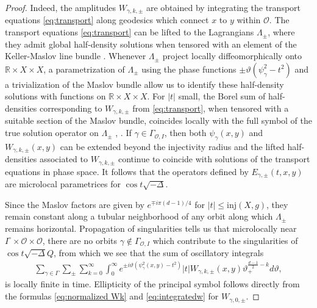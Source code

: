 \documentclass[11pt,letterpaper,oneside]{amsart}
\newcommand{\R}{\mathbb{R}}
\newcommand{\inj}{\text{inj}}
\renewcommand{\theta}{\vartheta}
\theoremstyle{definition}
\theoremstyle{remark}
\theoremstyle{definition}
\theoremstyle{remark}
\newcommand{\CO}{\mathcal{O}}
\begin{document}
\begin{proof}
    Indeed, the amplitudes $W_{\gamma, k, \pm}$ are obtained by integrating the transport equations \eqref{eq:transport} along geodesics which connect $x$ to $y$ within $\CO$. The transport equations \eqref{eq:transport} can be lifted to the Lagrangians $\Lambda_\pm$, where they admit global half-density solutions when tensored with an element of the Keller-Maslov line bundle \cite{GuilleminSternberg-SCA}. Whenever $\Lambda_\pm$ project locally diffeomorphically onto $\R \times X \times X$, a parametrization of $\Lambda_\pm$ using the phase functions $\pm \theta(\psi_\gamma^2 - t^2)$ and a trivialization of the Maslov bundle allow us to identify these half-density solutions with functions on $\R \times X \times X$. For $|t|$ small, the Borel sum of half-densities corresponding to $W_{\gamma, k, \pm}$ from \eqref{eq:transport}, when tensored with a suitable section of the Maslov bundle, coincides locally with the full symbol of the true solution operator on $\Lambda_\pm$ \cite{DuGu75}, \cite{DuHo72}. If $\gamma \in \Gamma_{\CO, I}$, then both $\psi_\gamma(x,y)$ and $W_{\gamma, k, \pm}(x,y)$ can be extended beyond the injectivity radius and the lifted half-densities associated to $W_{\gamma, k, \pm}$ continue to coincide with solutions of the transport equations in phase space. It follows that the operators defined by $E_{\gamma, \pm}(t,x,y)$ are microlocal parametrices for $\cos t \sqrt{- \Delta}$.

    \medskip
    
    Since the Maslov factors are given by $e^{\mp i \pi (d-1)/4}$ for $|t| \leq \inj(X,g)$, they remain constant along a tubular neighborhood of any orbit along which $\Lambda_\pm$ remains horizontal. Propagation of singularities tells us that microlocally near $I^\circ \times \CO \times \CO$, there are no orbits $\gamma \notin \Gamma_{\CO,I}$  which contribute to the singularities of $\cos t \sqrt{- \Delta} Q$, from which we see that the sum of oscillatory integrals
    \begin{align*}
        \sum_{\gamma \in \Gamma} \sum_\pm \sum_{k = 0}^\infty \int_0^\infty e^{\pm i \theta (\psi_{\gamma}^2(x,y)  - t^2)} |t|W_{\gamma, k, \pm} (x,y) \theta_+^{\frac{d- 1}{2} - k} d\theta,
    \end{align*}
    is locally finite in time. Ellipticity of the principal symbol follows directly from the formulas \eqref{eq:normalized Wk} and \eqref{eq:integratedw} for $W_{\gamma, 0, \pm}$.
\end{proof}
\end{document}
